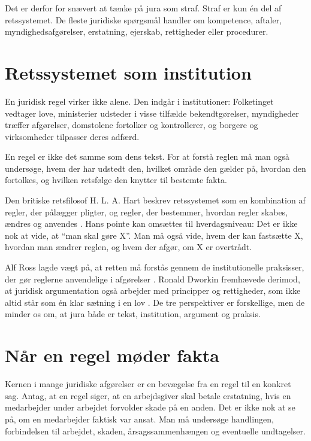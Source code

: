 Det er derfor for snævert at tænke på jura som straf. Straf er kun én del af retssystemet. De fleste juridiske spørgsmål handler om kompetence, aftaler, myndighedsafgørelser, erstatning, ejerskab, rettigheder eller procedurer.

\section{Retssystemet som institution}

En juridisk regel virker ikke alene. Den indgår i institutioner: Folketinget vedtager love, ministerier udsteder i visse tilfælde bekendtgørelser, myndigheder træffer afgørelser, domstolene fortolker og kontrollerer, og borgere og virksomheder tilpasser deres adfærd.

\begin{keybox}
En regel er ikke det samme som dens tekst. For at forstå reglen må man også undersøge, hvem der har udstedt den, hvilket område den gælder på, hvordan den fortolkes, og hvilken retsfølge den knytter til bestemte fakta.
\end{keybox}

Den britiske retsfilosof H. L. A. Hart beskrev retssystemet som en kombination af regler, der pålægger pligter, og regler, der bestemmer, hvordan regler skabes, ændres og anvendes \citep{hart}. Hans pointe kan omsættes til hverdagsniveau: Det er ikke nok at vide, at ``man skal gøre X''. Man må også vide, hvem der kan fastsætte X, hvordan man ændrer reglen, og hvem der afgør, om X er overtrådt.

Alf Ross lagde vægt på, at retten må forstås gennem de institutionelle praksisser, der gør reglerne anvendelige i afgørelser \citep{ross}. Ronald Dworkin fremhævede derimod, at juridisk argumentation også arbejder med principper og rettigheder, som ikke altid står som én klar sætning i en lov \citep{dworkin}. De tre perspektiver er forskellige, men de minder os om, at jura både er tekst, institution, argument og praksis.

\section{Når en regel møder fakta}

Kernen i mange juridiske afgørelser er en bevægelse fra en regel til en konkret sag. Antag, at en regel siger, at en arbejdsgiver skal betale erstatning, hvis en medarbejder under arbejdet forvolder skade på en anden. Det er ikke nok at se på, om en medarbejder faktisk var ansat. Man må undersøge handlingen, forbindelsen til arbejdet, skaden, årsagssammenhængen og eventuelle undtagelser.

